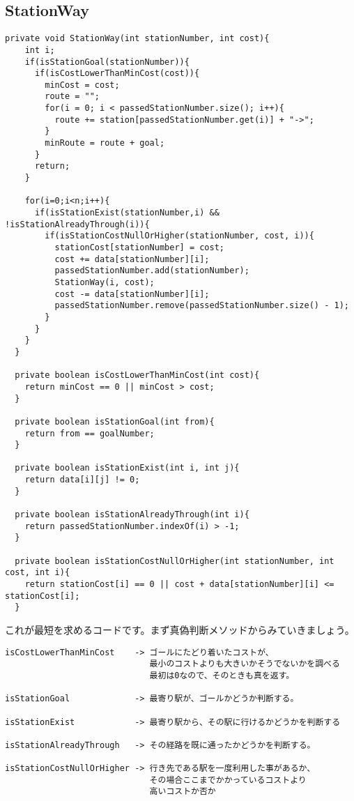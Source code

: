 \documentclass[titlepage]{jarticle}
\begin{document}
\subsection{StationWay}
\begin{verbatim}
private void StationWay(int stationNumber, int cost){
    int i;
    if(isStationGoal(stationNumber)){
      if(isCostLowerThanMinCost(cost)){
        minCost = cost;
        route = "";
        for(i = 0; i < passedStationNumber.size(); i++){
          route += station[passedStationNumber.get(i)] + "->";
        }
        minRoute = route + goal;
      }
      return;
    }

    for(i=0;i<n;i++){
      if(isStationExist(stationNumber,i) && !isStationAlreadyThrough(i)){
        if(isStationCostNullOrHigher(stationNumber, cost, i)){
          stationCost[stationNumber] = cost;
          cost += data[stationNumber][i];
          passedStationNumber.add(stationNumber);
          StationWay(i, cost);
          cost -= data[stationNumber][i];
          passedStationNumber.remove(passedStationNumber.size() - 1);
        }
      }
    }
  }

  private boolean isCostLowerThanMinCost(int cost){
    return minCost == 0 || minCost > cost;
  }

  private boolean isStationGoal(int from){
    return from == goalNumber;
  }

  private boolean isStationExist(int i, int j){
    return data[i][j] != 0;
  }

  private boolean isStationAlreadyThrough(int i){
    return passedStationNumber.indexOf(i) > -1;
  }

  private boolean isStationCostNullOrHigher(int stationNumber, int cost, int i){
    return stationCost[i] == 0 || cost + data[stationNumber][i] <= stationCost[i];
  }
\end{verbatim}
これが最短を求めるコードです。まず真偽判断メソッドからみていきましょう。

\begin{verbatim}
isCostLowerThanMinCost    -> ゴールにたどり着いたコストが、
                             最小のコストよりも大きいかそうでないかを調べる
                             最初は0なので、そのときも真を返す。

isStationGoal             -> 最寄り駅が、ゴールかどうか判断する。

isStationExist            -> 最寄り駅から、その駅に行けるかどうかを判断する

isStationAlreadyThrough   -> その経路を既に通ったかどうかを判断する。

isStationCostNullOrHigher -> 行き先である駅を一度利用した事があるか、
                             その場合ここまでかかっているコストより
                             高いコストか否か
\end{verbatim}
\end{document}
